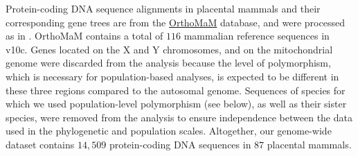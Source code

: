 \documentclass{article}
\begin{document}
    Protein-coding DNA sequence alignments in placental mammals and their corresponding gene trees are from the \href{https://www.orthomam.univ-montp2.fr}{OrthoMaM} database, and were processed as in \textcite{latrille_genes_2023}.
    OrthoMaM contains a total of $116$ mammalian reference sequences in v10c\cite{ranwez_orthomam_2007, douzery_orthomam_2014, scornavacca_orthomam_2019}.
    Genes located on the X and Y chromosomes, and on the mitochondrial genome were discarded from the analysis because the level of polymorphism, which is necessary for population-based analyses, is expected to be different in these three regions compared to the autosomal genome.
    Sequences of species for which we used population-level polymorphism (see below), as well as their sister species, were removed from the analysis to ensure independence between the data used in the phylogenetic and population scales.
    Altogether, our genome-wide dataset contains $14,509$ protein-coding DNA sequences in $87$ placental mammals.
\end{document}
